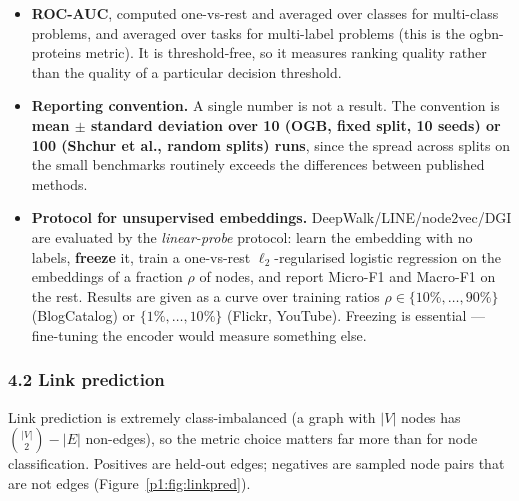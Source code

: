 \begin{itemize}[label=$\bullet$,leftmargin=1.3em]
        between the two numbers is the diagnostic, and reporting only Micro-F1 hides it.
  \item \textbf{ROC-AUC}, computed one-vs-rest and averaged over classes for multi-class
        problems, and averaged over tasks for multi-label problems (this is the ogbn-proteins
        metric). It is threshold-free, so it measures ranking quality rather than the
        quality of a particular decision threshold.
  \item \textbf{Reporting convention.} A single number is not a result. The convention is
        \textbf{mean $\pm$ standard deviation over 10 (OGB, fixed split, 10 seeds) or 100
        (Shchur et al., random splits) runs}, since the spread across splits on the small
        benchmarks routinely exceeds the differences between published methods.
  \item \textbf{Protocol for unsupervised embeddings.} DeepWalk/LINE/node2vec/DGI are
        evaluated by the \emph{linear-probe} protocol: learn the embedding with no labels,
        \textbf{freeze} it, train a one-vs-rest $\ell_2$-regularised logistic regression on
        the embeddings of a fraction $\rho$ of nodes, and report Micro-F1 and Macro-F1 on
        the rest. Results are given as a curve over training ratios
        $\rho\in\{10\%,\dots,90\%\}$ (BlogCatalog) or $\{1\%,\dots,10\%\}$ (Flickr, YouTube).
        Freezing is essential --- fine-tuning the encoder would measure something else.
\end{itemize}

\subsubsection*{4.2 Link prediction}

Link prediction is extremely class-imbalanced (a graph with $|V|$ nodes has
$\binom{|V|}{2}\!-\!|E|$ non-edges), so the metric choice matters far more than for node
classification. Positives are held-out edges; negatives are sampled node pairs that are not
edges (Figure~\ref{p1:fig:linkpred}).

